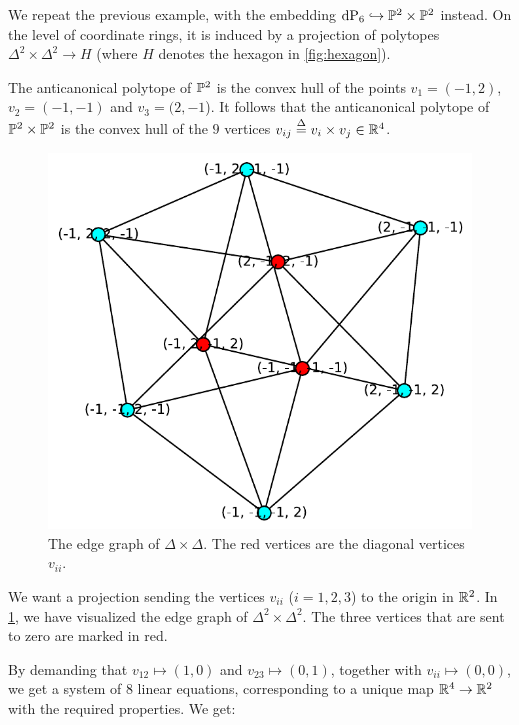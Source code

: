 \begin{example}
\label{example:p2p2}
We repeat the previous example, with the embedding $\dP6 \hookrightarrow \P^2 \times \P^2$ instead. On the level of coordinate rings, it is induced by a projection of polytopes $\Delta^2 \times \Delta^2 \to H$ (where $H$ denotes the hexagon in \cref{fig:hexagon}).

The anticanonical polytope of $\P^2$ is the convex hull of the points $v_1=(-1,2)$, $v_2=(-1,-1)$ and $v_3=(2,-1$). It follows that the anticanonical polytope of $\P^2 \times \P^2$ is the convex hull of the $9$ vertices $v_{ij} \stackrel{\Delta}{=} v_i \times v_j \in \R^4$.

\begin{figure}
  \centering
  \includegraphics[scale=0.7]{./figures/grafDD.pdf}
  \caption{The edge graph of $\Delta \times \Delta$. The red vertices are the diagonal vertices $v_{ii}$.}
  \label{fig:edgegraphDD}
\end{figure}

We want a projection sending the vertices $v_{ii}$ ($i=1,2,3$) to the origin in $\R^2$. In \cref{fig:edgegraphDD}, we have visualized the edge graph of $\Delta^2 \times \Delta^2$. The three vertices that are sent to zero are marked in red.

By demanding that $v_{12} \mapsto (1,0)$ and $v_{23} \mapsto (0,1)$, together with $v_{ii} \mapsto (0,0)$, we get a system of $8$ linear equations, corresponding to a unique map $\R^4 \to \R^2$ with the required properties. We get:


\end{example}

